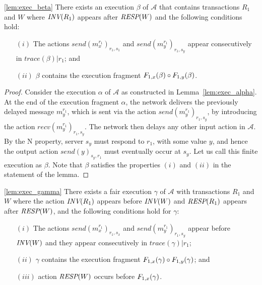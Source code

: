 \begin{lemma*}\ref{lem:exec_beta} 
There exists an  execution $\beta$ of $\mathcal{A}$ that contains transactions $R_1$ and $W$ where ${\textit{INV}(R_1)}$ 
appears after ${\textit{RESP}(W)}$ and the following conditions hold:
\begin{enumerate}
\item[$(i)$] The actions $send(m_x^{r_1})_{r_1, s_1}$ and  $send(m_y^{r_1})_{r_1, s_y}$ appear consecutively in 
$trace(\beta)|r_1$; and
\item[$(ii)$]   $\beta$ contains the execution fragment  ${ F_{1, x}(\beta)} \circ { F_{1, y}(\beta)}$.
\end{enumerate} 
\end{lemma*}

\begin{proof}
Consider the  execution $\alpha$ of $\mathcal{A}$ as constructed in Lemma~\ref{lem:exec_alpha}.  
At the end of the execution fragment $\alpha$,  the network  delivers the previously delayed message
 $m_y^{r_1}$, which is sent via the action $send(m_y^{r_1})_{r_1, s_y}$,  by  introducing the action $recv(m_y^{r_1})_{r_1, s_y}$. The network then delays any other  input action in $\mathcal{A}$. By the N property,  
server $s_y$ must respond to $r_1$, with some value $y$,  and hence 
the output action $send(y)_{s_y, r_1}$ must eventually occur at $s_y$.  
Let us call this finite execution as $\beta$. Note that $\beta$ satisfies the  properties $(i)$ and $(ii)$ in the statement of the lemma.
\end{proof}


\begin{lemma*}\ref{lem:exec_gamma} 
There exists a fair execution $\gamma$ of $\mathcal{A}$ with transactions $R_1$ and $W$ where the action  ${\textit{INV}(R_1)}$ appears before ${\textit{INV}(W)}$ and ${\textit{RESP}(R_1)}$ appears after  ${\textit{RESP}(W)}$,  and the following conditions hold for $\gamma$:
\begin{enumerate}
\item[$(i)$] The actions $send(m_x^{r_1})_{r_1, s_x}$ and  $send(m_y^{r_1})_{r_1, s_y}$  appear before ${\textit{INV}(W)}$ and they appear consecutively in $trace(\gamma)|r_1$;
\item[$(ii)$]   $\gamma$ contains the execution fragment  ${ F_{1,x}(\gamma)} \circ { F_{1,y}(\gamma)}$; and 
\item[$(iii)$] action ${\textit{RESP}(W)}$ occurs before ${ F_{1,x}(\gamma)}$.
\end{enumerate} 
\end{lemma*}



